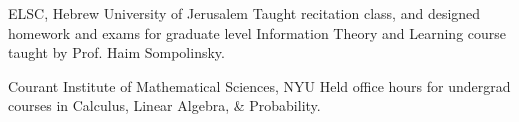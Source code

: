 {}
{ELSC, Hebrew University of Jerusalem}
{Taught recitation class, and designed homework and exams for graduate level Information Theory and Learning course taught by Prof. Haim Sompolinsky.}

{}
{Courant Institute of Mathematical Sciences, NYU}
{Held office hours for undergrad courses in Calculus, Linear Algebra, \& Probability.}
%
%

